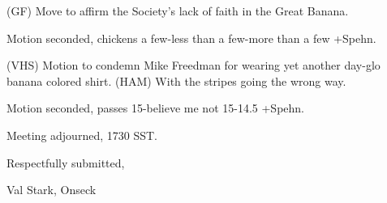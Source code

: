 \documentclass[12pt]{article}
\begin{document}
(GF) Move to affirm the Society's lack of faith in the Great Banana.

Motion seconded, chickens a few-less than a few-more than a few +Spehn.

(VHS) Motion to condemn Mike Freedman for wearing yet another day-glo banana colored shirt. (HAM) With the stripes going the wrong way.

Motion seconded, passes 15-believe me not 15-14.5 +Spehn.

\vspace{12pt}

\noindent
Meeting adjourned, 1730 SST.

\vspace{18pt}

\centerline{Respectfully submitted,}
\centerline{Val Stark, Onseck}
\end{document}

